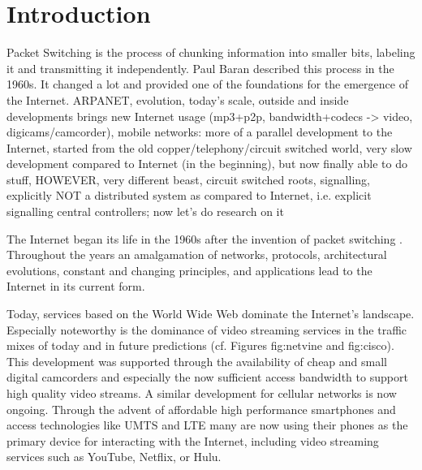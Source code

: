 \chapter{Introduction}
\label{chap:intro}

Packet Switching is the process of chunking information into smaller bits, labeling it and transmitting it independently. Paul Baran described this process in the 1960s\cite{baran1964distributed}. It changed a lot and provided one of the foundations for the emergence of the Internet. ARPANET, evolution, today's scale, outside and inside developments brings new Internet usage (mp3+p2p, bandwidth+codecs -> video, digicams/camcorder), mobile networks: more of a parallel development to the Internet, started from the old copper/telephony/circuit switched world, very slow development compared to Internet (in the beginning), but now finally able to do stuff, HOWEVER, very different beast, circuit switched roots, signalling, explicitly NOT a distributed system as compared to Internet, i.e. explicit signalling central controllers; now let's do research on it


The Internet began its life in the 1960s after the invention of packet switching \cite{baran1964distributed}. Throughout the years an amalgamation of networks, protocols, architectural evolutions, constant and changing principles, and applications lead to the Internet in its current form.

Today, services based on the World Wide Web dominate the Internet's landscape. Especially noteworthy is the dominance of video streaming services in the traffic mixes of today and in future predictions (cf. Figures fig:netvine and fig:cisco). This development was supported through the availability of cheap and small digital camcorders and especially the now sufficient access bandwidth to support high quality video streams.
A similar development for cellular networks is now ongoing. Through the advent of affordable high performance smartphones and access technologies like UMTS and LTE many are now using their phones as the primary device for interacting with the Internet, including video streaming services such as YouTube, Netflix, or Hulu.

